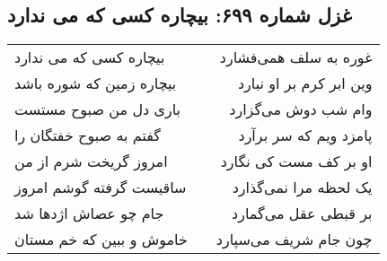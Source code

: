 \begin{center}
\section*{غزل شماره ۶۹۹: بیچاره کسی که می ندارد}
\label{sec:0699}
\begin{longtable}{l p{0.5cm} r}
بیچاره کسی که می ندارد
&&
غوره به سلف همی‌فشارد
\\
بیچاره زمین که شوره باشد
&&
وین ابر کرم بر او نبارد
\\
باری دل من صبوح مستست
&&
وام شب دوش می‌گزارد
\\
گفتم به صبوح خفتگان را
&&
پامزد ویم که سر برآرد
\\
امروز گریخت شرم از من
&&
او بر کف مست کی نگارد
\\
ساقیست گرفته گوشم امروز
&&
یک لحظه مرا نمی‌گذارد
\\
جام چو عصاش اژدها شد
&&
بر قبطی عقل می‌گمارد
\\
خاموش و ببین که خم مستان
&&
چون جام شریف می‌سپارد
\\
\end{longtable}
\end{center}
